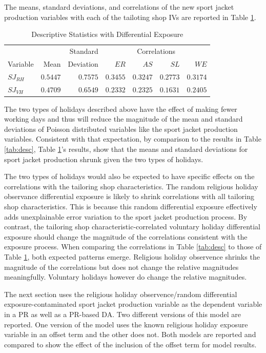 \documentclass[ShortAfour,times,sageapa]{sagej}
\begin{document}
	The means, standard deviations, and correlations of the new sport jacket production variables with each of the tailoting shop IVs are reported in Table \ref{tab:dscEx}.
	
	\begin{table}[h!]
		\centering
		\caption{\centering Descriptive Statistics with Differential Exposure}
		\begin{tabular}{lrrrrrr}
			\toprule
			&  &  Standard & \multicolumn{4}{c}{Correlations} \\ 
			\cmidrule(lr){4-7}
			Variable & Mean & Deviation & $ER$ & $AS$ & $SL$ & $WE$ \\ 
			\midrule
			$SJ_{RH}$ & $0.5447$ & $0.7575$ & $0.3455$ & $0.3247$ & $0.2773$ & $0.3174$ \\ 
			$SJ_{VH}$ & $0.4709$ & $0.6549$ & $0.2332$ & $0.2325$ & $0.1631$ & $0.2405$ \\ 
			\bottomrule
		\end{tabular}
		\label{tab:dscEx}
	\end{table}
	
	The two types of holidays described above have the effect of making fewer working days and thus will reduce the magnitude of the mean and standard deviations of Poisson distributed variables like the sport jacket production variables.	
	Consistent with that expectation, by comparison to the results in Table \ref{tab:desc}, Table \ref{tab:dscEx}'s results, show that the means and standard deviations for sport jacket production shrunk given the two types of holidays.
	
	The two types of holidays would also be expected to have specific effects on the correlations with the tailoring shop characteristics.
	The random religious holiday observance differential exposure is likely to shrink correlations with all tailoring shop characteristics.
	This is because this random differential exposure effectively adds unexplainable error variation to the sport jacket production process.
	By contrast, the tailoring shop characteristic-correlated voluntary holiday differential exposure should change the magnitude of the correlations consistent with the exposure process.
	When comparing the correlations in Table \ref{tab:desc} to those of Table \ref{tab:dscEx}, both expected patterns emerge.
	Religious holiday observence shrinks the magnitude of the correlations but does not change the relative magnitudes meaningfully.
	Voluntary holidays however do change the relative magnitudes.
	
	The next section uses the religious holiday observence/random differential exposure-contaminated sport jacket production variable as the dependent variable in a PR as well as a PR-based DA.
	Two different versions of this model are reported.
	One version of the model uses the known religious holiday exposure variable in an offset term and the other does not.
	Both models are reported and compared to show the effect of the inclusion of the offset term for model results.
	
\end{document}
